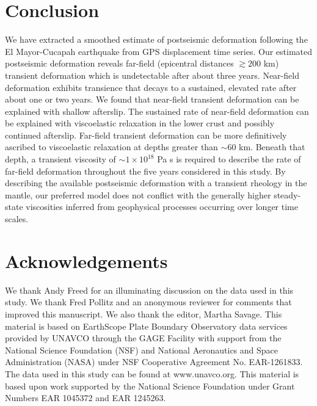 \documentclass[draft,linenumbers]{AGUJournal}
\begin{document}
\section{Conclusion}
We have extracted a smoothed estimate of postseismic deformation following the El Mayor-Cucapah earthquake from GPS displacement time series.  Our estimated postseismic deformation reveals far-field (epicentral distances ${\gtrsim}200$ km) transient deformation which is undetectable after about three years. Near-field deformation exhibits transience that decays to a sustained, elevated rate after about one or two years.  We found that near-field transient deformation can be explained with shallow afterslip.  The sustained rate of near-field deformation can be explained with viscoelastic relaxation in the lower crust and possibly continued afterslip.  Far-field transient deformation can be more definitively ascribed to viscoelastic relaxation at depths greater than ${\sim}60$ km. Beneath that depth, a transient viscosity of ${\sim}1\times10^{18}$ Pa s is required to describe the rate of far-field deformation throughout the five years considered in this study.  By describing the available postseismic deformation with a transient rheology in the mantle, our preferred model does not conflict with the generally higher steady-state viscosities inferred from geophysical processes occurring over longer time scales.

\section*{Acknowledgements}
We thank Andy Freed for an illuminating discussion on the data used in this study.  We thank Fred Pollitz and an anonymous reviewer for comments that improved this manuscript. We also thank the editor, Martha Savage.  This material is based on EarthScope Plate Boundary Observatory data services provided by UNAVCO through the GAGE Facility with support from the National Science Foundation (NSF) and National Aeronautics and Space Administration (NASA) under NSF Cooperative Agreement No. EAR-1261833.  The data used in this study can be found at www.unavco.org. This material is based upon work supported by the National Science Foundation under Grant Numbers EAR 1045372 and EAR 1245263.
\end{document}
